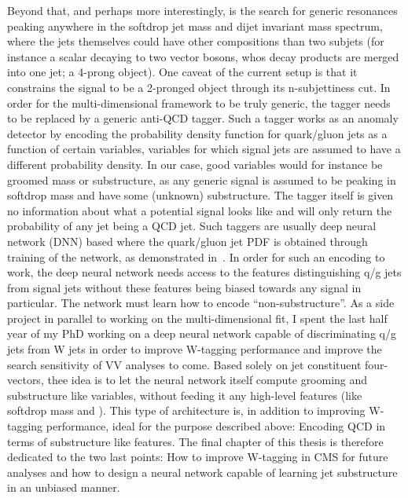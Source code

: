 Beyond that, and perhaps more interestingly, is the search for generic resonances peaking anywhere in the softdrop jet mass and dijet invariant mass spectrum, where the jets themselves could have other compositions than two subjets (for instance a scalar decaying to two vector bosons, whos decay products are merged into one jet; a 4-prong object). One caveat of the current setup is that it constrains the signal to be a 2-pronged object through its n-subjettiness cut. In order for the multi-dimensional framework to be truly generic, the tagger needs to be replaced by a generic anti-QCD tagger. Such a tagger works as an anomaly detector by encoding the probability density function for quark/gluon jets as a function of certain variables, variables for which signal jets are assumed to have a different probability density.
In our case, good variables would for instance be groomed mass or substructure, as any generic signal is assumed to be peaking in softdrop mass and have some (unknown) substructure. The tagger itself is given no information about what a potential signal looks like and will only return the probability of any jet being a QCD jet. Such taggers are usually deep neural network (DNN) based where the quark/gluon jet PDF is obtained through training of the network, as demonstrated in~\cite{Heimel:2018mkt,Aguilar-Saavedra:2017rzt}.\newline
In order for such an encoding to work, the deep neural network needs access to the features distinguishing q/g jets from signal jets without these features being biased towards any signal in particular. The network must learn how to encode ``non-substructure''.\newline
As a side project in parallel to working on the multi-dimensional fit, I spent the last half year of my PhD working on a deep neural network capable of discriminating q/g jets from W jets in order to improve W-tagging performance and improve the search sensitivity of VV analyses to come. Based solely on jet constituent four-vectors, thee idea is to let the neural network itself compute grooming and substructure like variables, without feeding it any high-level features (like softdrop mass and \nsubj). 
This type of architecture is, in addition to improving W-tagging performance, ideal for the purpose described above: Encoding QCD in terms of substructure like features. The final chapter of this thesis is therefore dedicated to the two last points: How to improve W-tagging in CMS for future analyses and how to design a neural network capable of learning jet substructure in an unbiased manner.  
\clearpage

